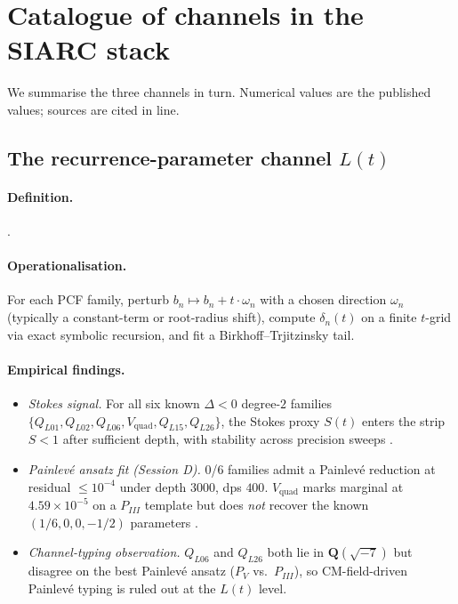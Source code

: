\documentclass[11pt,reqno]{amsart}
\theoremstyle{plain}
\theoremstyle{definition}
\theoremstyle{remark}
\newcommand{\Lt}{L(t)}
\newcommand{\Vquad}{V_{\mathrm{quad}}}
\newcommand{\dn}{\delta_{n}}
\begin{document}
\section{Catalogue of channels in the SIARC stack}
\label{sec:catalogue}

We summarise the three channels in turn. Numerical values are
the published values; sources are cited in line.

\subsection{The recurrence-parameter channel $\Lt$}
\label{ssec:lt}

\paragraph{Definition.} .

\paragraph{Operationalisation.} For each PCF family, perturb
$b_n \mapsto b_n + t \cdot \omega_n$ with a chosen direction
$\omega_n$ (typically a constant-term or root-radius shift),
compute $\dn(t)$ on a finite $t$-grid via exact symbolic
recursion, and fit a Birkhoff--Trjitzinsky tail.

\paragraph{Empirical findings.}
\begin{itemize}
\item \emph{Stokes signal.} For all six known $\Delta<0$
degree-$2$ families
$\{Q_{L01}, Q_{L02}, Q_{L06}, \Vquad, Q_{L15}, Q_{L26}\}$,
the Stokes proxy $S(t)$ enters the strip $S<1$ after
sufficient depth, with stability across precision sweeps
\cite{siarc_pcf1_v13}.
\item \emph{Painlev\'e ansatz fit (Session D).} 0/6 families
admit a Painlev\'e reduction at residual $\le 10^{-4}$
under depth $3000$, dps $400$. $\Vquad$ marks marginal at
$4.59 \times 10^{-5}$ on a $P_{III}$ template but does
\emph{not} recover the known $(1/6, 0, 0, -1/2)$ parameters
\cite{siarc_painleve_deep_6x}.
\item \emph{Channel-typing observation.} $Q_{L06}$ and
$Q_{L26}$ both lie in $\mathbf{Q}(\sqrt{-7})$ but disagree
on the best Painlev\'e ansatz ($P_V$ vs.\ $P_{III}$), so
CM-field-driven Painlev\'e typing is ruled out at the $\Lt$
level.
\end{itemize}
\end{document}
